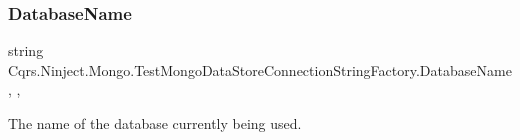 \subsubsection{\texorpdfstring{Database\+Name}{DatabaseName}}
{\footnotesize\ttfamily string Cqrs.\+Ninject.\+Mongo.\+Test\+Mongo\+Data\+Store\+Connection\+String\+Factory.\+Database\+Name\hspace{0.3cm}{\ttfamily [static]}, {\ttfamily [get]}, {\ttfamily [set]}}



The name of the database currently being used. 

